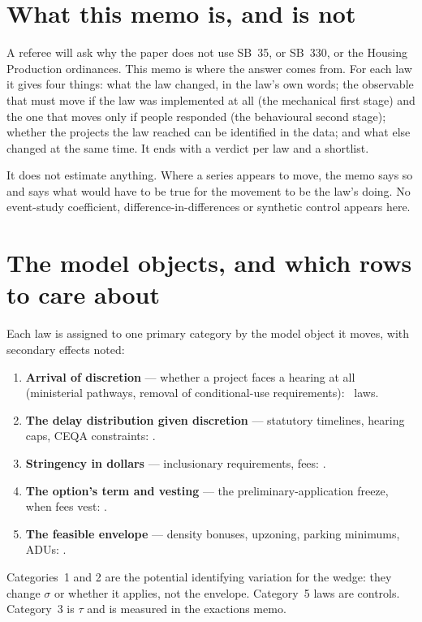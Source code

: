 \documentclass[11pt]{article}
\begin{document}
\clearpage
\tableofcontents
\clearpage

\section{What this memo is, and is not}\label{sec:rtintro}

A referee will ask why the paper does not use SB~35, or SB~330, or the Housing Production
ordinances. This memo is where the answer comes from. For each law it gives four things: what
the law changed, in the law's own words; the observable that must move if the law was
implemented at all (the mechanical first stage) and the one that moves only if people responded
(the behavioural second stage); whether the projects the law reached can be identified in the
data; and what else changed at the same time. It ends with a verdict per law and a shortlist.

It does not estimate anything. Where a series appears to move, the memo says so and says what
would have to be true for the movement to be the law's doing. No event-study coefficient,
difference-in-differences or synthetic control appears here.

\section{The model objects, and which rows to care about}\label{sec:rtcats}

Each law is assigned to one primary category by the model object it moves, with secondary
effects noted:
\begin{enumerate}
\item \textbf{Arrival of discretion} --- whether a project faces a hearing at all (ministerial
pathways, removal of conditional-use requirements): \rtCatOne\ laws.
\item \textbf{The delay distribution given discretion} --- statutory timelines, hearing caps,
CEQA constraints: \rtCatTwo.
\item \textbf{Stringency in dollars} --- inclusionary requirements, fees: \rtCatThree.
\item \textbf{The option's term and vesting} --- the preliminary-application freeze, when fees
vest: \rtCatFour.
\item \textbf{The feasible envelope} --- density bonuses, upzoning, parking minimums, ADUs:
\rtCatFive.
\end{enumerate}
Categories~1 and 2 are the potential identifying variation for the wedge: they change $\sigma$
or whether it applies, not the envelope. Category~5 laws are controls. Category~3 is $\tau$ and
is measured in the exactions memo.
\end{document}
